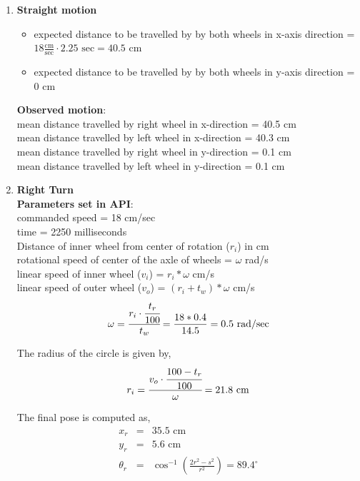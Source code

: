 \begin{enumerate}
\item \textbf{Straight motion}
\begin{itemize}
\item expected distance to be travelled by by both wheels in x-axis direction = $ 18\frac{\text{cm}}{\text{sec}}  \cdot 2.25 \text{ sec} = 40.5$ cm
\item expected distance to be travelled by by both wheels in y-axis direction = $0$ cm
\end{itemize}

\textbf{Observed motion}:\\
mean distance travelled by right wheel in x-direction = 40.5 cm\\
mean distance travelled by left wheel in x-direction = 40.3 cm \\
mean distance travelled by right wheel in y-direction = 0.1 cm \\
mean distance travelled by left wheel in y-direction = 0.1 cm 

\item \textbf{Right Turn} \\
\textbf{Parameters set in API}: \\
commanded speed = 18 cm/sec \\
time = 2250 milliseconds \\
	
Distance of inner wheel from center of rotation ($r_i$) in cm \\ 
rotational speed of center of the axle of wheels = $\omega$ rad/s \\
linear speed of inner wheel ($v_i$) = $r_i * \omega$ cm/s \\
linear speed of outer wheel ($v_o$) = $(r_i + t_w ) * \omega$ cm/s \\

\begin{equation}
\omega = \cfrac{r_i \cdot \cfrac{t_r}{100}}{t_w} = \frac{18 * 0.4}{14.5} = 0.5 \text{ rad/sec}
\end{equation}

The radius of the circle is given by,
\begin{equation}
r_i = \cfrac{v_o \cdot \cfrac{100 - t_r}{100}}{\omega} = 21.8 \text{ cm}
\end{equation}

The final pose is computed as,
\begin{equation}
\begin{array}{rcl}
x_r &=& 35.5 \text{ cm} \\
y_r &=& 5.6 \text{ cm} \\
\theta_r &=& \cos^{-1}\left(\frac{2r^2 - s^2}{r^2}\right) = 89.4^{\circ}
\end{array}
\end{equation}


\end{enumerate}
